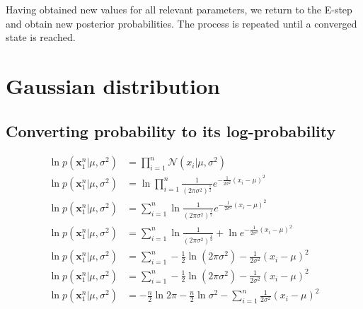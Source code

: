 Having obtained new values for all relevant parameters, we return to the E-step and obtain new posterior probabilities. The process is repeated until a converged state is reached.\\

\newpage

\chapter{Gaussian distribution}
\section{Converting probability to its log-probability}\label{AP:log_prob}
\begin{equation}\label{eq:ap_logprob}
\begin{split}
    \ln p(\textbf{x}^n_1 | \mu, \sigma^2) &= \prod_{i=1}^{n}{\mathcal{N}(x_i|\mu, \sigma^2)}\\
    \ln p(\textbf{x}^n_1 | \mu, \sigma^2) &= \ln \prod_{i=1}^{n}\frac{1}{(2 \pi \sigma ^2)^{\frac{1}{2}}} e^{- \frac{1}{2\sigma ^2}(x_i - \mu)^2}\\
    \ln p(\textbf{x}^n_1 | \mu, \sigma^2) &= \sum_{i=1}^{n} \ln \frac{1}{(2 \pi \sigma ^2)^{\frac{1}{2}}} e^{- \frac{1}{2\sigma ^2}(x_i - \mu)^2}\\
    \ln p(\textbf{x}^n_1 | \mu, \sigma^2) &= \sum_{i=1}^{n} \ln \frac{1}{(2 \pi \sigma ^2)^{\frac{1}{2}}} + \ln e^{- \frac{1}{2\sigma ^2}(x_i - \mu)^2}\\
    \ln p(\textbf{x}^n_1 | \mu, \sigma^2) &= \sum_{i=1}^{n} -\frac{1}{2} \ln (2 \pi \sigma ^2) - \frac{1}{2\sigma ^2}(x_i - \mu)^2\\
    \ln p(\textbf{x}^n_1 | \mu, \sigma^2) &= \sum_{i=1}^{n} -\frac{1}{2} \ln (2 \pi \sigma ^2) - \frac{1}{2\sigma ^2}(x_i - \mu)^2\\
    \ln p(\textbf{x}^n_1 | \mu, \sigma^2) &= -\frac{n}{2} \ln 2 \pi -\frac{n}{2} \ln \sigma ^2 - \sum_{i=1}^{n} \frac{1}{2\sigma ^2}(x_i - \mu)^2\\
\end{split}
\end{equation}

